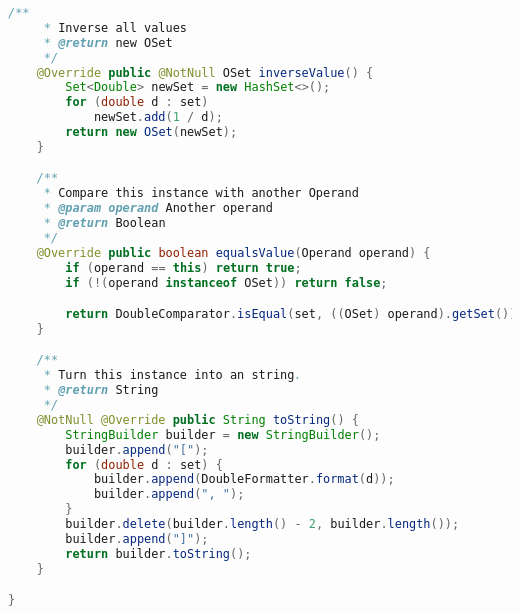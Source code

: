 \begin{lstlisting}[caption=OSet (Meinerzhagen),label=list:OSet,language=Java]
    /**
     * Inverse all values
     * @return new OSet
     */
    @Override public @NotNull OSet inverseValue() {
        Set<Double> newSet = new HashSet<>();
        for (double d : set)
            newSet.add(1 / d);
        return new OSet(newSet);
    }

    /**
     * Compare this instance with another Operand
     * @param operand Another operand
     * @return Boolean
     */
    @Override public boolean equalsValue(Operand operand) {
        if (operand == this) return true;
        if (!(operand instanceof OSet)) return false;

        return DoubleComparator.isEqual(set, ((OSet) operand).getSet());
    }

    /**
     * Turn this instance into an string.
     * @return String
     */
    @NotNull @Override public String toString() {
        StringBuilder builder = new StringBuilder();
        builder.append("[");
        for (double d : set) {
            builder.append(DoubleFormatter.format(d));
            builder.append(", ");
        }
        builder.delete(builder.length() - 2, builder.length());
        builder.append("]");
        return builder.toString();
    }

}
\end{lstlisting}    

